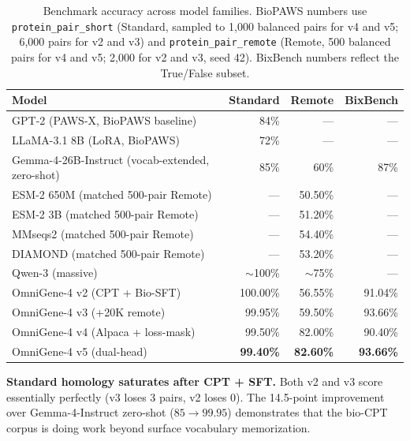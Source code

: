 \documentclass[11pt]{article}
\begin{document}
\begin{table}[H]
\centering
\small
\caption{Benchmark accuracy across model families. BioPAWS numbers use \texttt{protein\_pair\_short} (Standard, sampled to 1{,}000 balanced pairs for v4 and v5; 6{,}000 pairs for v2 and v3) and \texttt{protein\_pair\_remote} (Remote, 500 balanced pairs for v4 and v5; 2{,}000 for v2 and v3, seed 42). BixBench numbers reflect the True/False subset.}
\label{tab:benchmarks}
\begin{tabular}{lrrr}
\toprule
\textbf{Model} & \textbf{Standard} & \textbf{Remote} & \textbf{BixBench} \\
\midrule
GPT-2 (PAWS-X, BioPAWS baseline)        & 84\%   & ---    & ---    \\
LLaMA-3.1 8B (LoRA, BioPAWS)            & 72\%   & ---    & ---    \\
Gemma-4-26B-Instruct (vocab-extended, zero-shot)  & 85\%   & 60\%   & 87\%   \\
ESM-2 650M (matched 500-pair Remote)    & ---    & 50.50\% & ---   \\
ESM-2 3B (matched 500-pair Remote)      & ---    & 51.20\% & ---   \\
MMseqs2 (matched 500-pair Remote)       & ---    & 54.40\% & ---   \\
DIAMOND (matched 500-pair Remote)       & ---    & 53.20\% & ---   \\
Qwen-3 (massive)                        & $\sim$100\% & $\sim$75\% & ---    \\
\midrule
OmniGene-4 v2 (CPT + Bio-SFT)           & 100.00\% & 56.55\% & 91.04\% \\
OmniGene-4 v3 (+20K remote)             &  99.95\% & 59.50\% & 93.66\% \\
OmniGene-4 v4 (Alpaca + loss-mask)      &  99.50\% & 82.00\% & 90.40\% \\
OmniGene-4 v5 (dual-head)               & \textbf{99.40\%} & \textbf{82.60\%} & \textbf{93.66\%} \\
\bottomrule
\end{tabular}
\end{table}

\textbf{Standard homology saturates after CPT + SFT.} Both v2 and v3 score essentially perfectly (v3 loses 3 pairs, v2 loses 0). The 14.5-point improvement over Gemma-4-Instruct zero-shot ($85 \to 99.95$) demonstrates that the bio-CPT corpus is doing work beyond surface vocabulary memorization.
\end{document}
